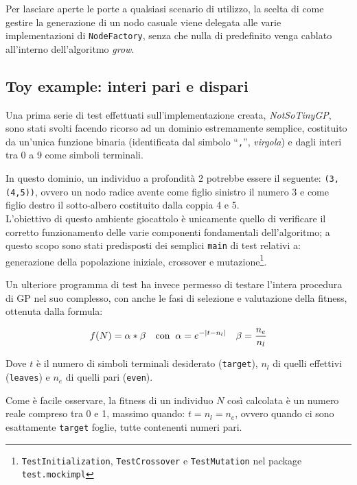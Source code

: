 \documentclass{../llncs}
\DeclarePairedDelimiter{\abs}{\lvert}{\rvert}
\begin{document}
Per lasciare aperte le porte a qualsiasi scenario di utilizzo, la scelta di come gestire la generazione di un nodo casuale viene delegata alle varie implementazioni di \texttt{NodeFactory}, senza che nulla di predefinito venga cablato all'interno dell'algoritmo \emph{grow}.

\subsection{Toy example: interi pari e dispari}
Una prima serie di test effettuati sull'implementazione creata, \emph{NotSoTinyGP}, sono stati svolti facendo ricorso ad un dominio estremamente semplice, costituito da un'unica funzione binaria (identificata dal simbolo ``\texttt{,}'', \textit{virgola}) e dagli interi tra 0 a 9 come simboli terminali.

In questo dominio, un individuo a profondità 2 potrebbe essere il seguente: \texttt{(3,(4,5))}, ovvero un nodo radice avente come figlio sinistro il numero 3 e come figlio destro il sotto-albero costituito dalla coppia 4 e 5.\\

L'obiettivo di questo ambiente giocattolo è unicamente quello di verificare il corretto funzionamento delle varie componenti fondamentali dell'algoritmo; a questo scopo sono stati predisposti dei semplici \texttt{main} di test relativi a: generazione della popolazione iniziale, crossover e mutazione\footnote{\texttt{TestInitialization}, \texttt{TestCrossover} e \texttt{TestMutation} nel package \texttt{test.mockimpl}}.

Un ulteriore programma di test ha invece permesso di testare l'intera procedura di GP nel suo complesso, con anche le fasi di selezione e valutazione della fitness, ottenuta dalla formula:

\[
f(N)=\alpha*\beta \quad
\text{con $\:\alpha=e^{-\abs{t-n_l}} \quad \beta=\frac{n_e}{n_l}$}
\]

Dove $t$ è il numero di simboli terminali desiderato (\texttt{target}), $n_l$ di quelli effettivi (\texttt{leaves}) e $n_e$ di quelli pari (\texttt{even}).

Come è facile osservare, la fitness di un individuo $N$ così calcolata è un numero reale compreso tra 0 e 1, massimo quando: $t=n_l=n_e$, ovvero quando ci sono esattamente \texttt{target} foglie, tutte contenenti numeri pari.\\
\end{document}
